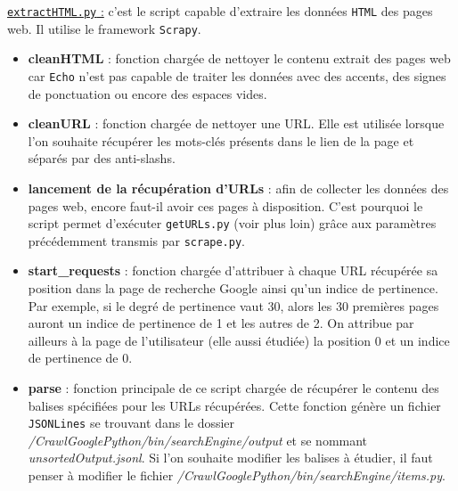\documentclass[12pt]{article}
\begin{document}
\newpage
\underline{\texttt{extractHTML.py} :} c'est le script capable d'extraire les données \texttt{HTML} des pages web. Il utilise le framework \texttt{Scrapy}.
\begin{itemize}
	\item \textbf{cleanHTML} : fonction chargée de nettoyer le contenu extrait des pages web car \texttt{Echo} n'est pas capable de traiter les données avec des accents, des signes de ponctuation ou encore des espaces vides.
	\item \textbf{cleanURL} : fonction chargée de nettoyer une URL. Elle est utilisée lorsque l'on souhaite récupérer les mots-clés présents dans le lien de la page et séparés par des anti-slashs.
	\item \textbf{lancement de la récupération d'URLs} : afin de collecter les données des pages web, encore faut-il avoir ces pages à disposition. C'est pourquoi le script permet d'exécuter \texttt{getURLs.py} (voir plus loin) grâce aux paramètres précédemment transmis par \texttt{scrape.py}.
	\item \textbf{start\_requests} : fonction chargée d'attribuer à chaque URL récupérée sa position dans la page de recherche Google ainsi qu'un indice de pertinence. Par exemple, si le degré de pertinence vaut 30, alors les 30 premières pages auront un indice de pertinence de 1 et les autres de 2. On attribue par ailleurs à la page de l'utilisateur (elle aussi étudiée) la position 0 et un indice de pertinence de 0.
	\item \textbf{parse} : fonction principale de ce script chargée de récupérer le contenu des balises spécifiées pour les URLs récupérées. Cette fonction génère un fichier \texttt{JSONLines} se trouvant dans le dossier \textit{/CrawlGooglePython/bin/searchEngine/output} et se nommant \textit{unsortedOutput.jsonl}. Si l'on souhaite modifier les balises à étudier, il faut penser à modifier le fichier \textit{/CrawlGooglePython/bin/searchEngine/items.py}. 
\end{itemize}
\end{document}
